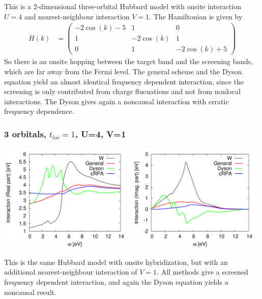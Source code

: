 \documentclass[12pt,a4paper]{scrartcl}
\numberwithin{equation}{section}
\begin{document}
This is a 2-dimensional three-orbital Hubbard model with onsite interaction $U=4$ and nearest-neighbour
interaction $V=1$. The Hamiltonian is given by
\begin{align}
 H(k) &=
 \begin{pmatrix}
  -2\cos(k) - 5 & 1 & 0 \\  
  1 & -2\cos(k)  & 1 \\
  0 & 1 &-2\cos(k) + 5  
 \end{pmatrix}
\end{align}
So there is an onsite hopping between the target band and the screening bands, which are far away from the Fermi level.
The general scheme and the Dyson equation yield an almost identical frequency dependent interaction,
since the screening is only contributed from charge flucuations and not from nonlocal interactions.
The Dyson gives again a noncausal interaction with erratic frequency dependence.

\subsubsection{3 orbitals, $t_{loc}=1$, U=4, V=1}
\includegraphics[width=0.49\textwidth]{figs/bathNonlocFromDMFTderiv/3orb_U4_V1_real.pdf}
\includegraphics[width=0.49\textwidth]{figs/bathNonlocFromDMFTderiv/3orb_U4_V1_imag.pdf}

This is the same Hubbard model with onsite hybridization, but with an additional nearest-neighbour interaction
of $V=1$. All methods give a screened frequency dependent interaction, and again the Dyson equation yields
a noncausal result.
\end{document}
